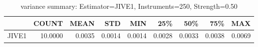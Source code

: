 \begin{table}[ht]
\centering
\caption{variance summary: Estimator=JIVE1, Instruments=250, Strength=0.50}
\begin{tabular}{lrrrrrrrr}
\toprule
 & COUNT & MEAN & STD & MIN & 25\% & 50\% & 75\% & MAX \\
\midrule
JIVE1 & 10.0000 & 0.0035 & 0.0014 & 0.0014 & 0.0028 & 0.0033 & 0.0038 & 0.0069 \\
\bottomrule
\end{tabular}
\end{table}
